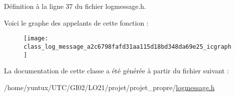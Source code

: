 \-Définition à la ligne 37 du fichier logmessage.\-h.



\-Voici le graphe des appelants de cette fonction \-:\nopagebreak
\begin{figure}[H]
\begin{center}
\leavevmode
\texttt{[image: class\_log\_message\_a2c6798fafd31aa115d18bd348da69e25\_icgraph]}
\end{center}
\end{figure}




\-La documentation de cette classe a été générée à partir du fichier suivant \-:\begin{DoxyCompactItemize}
\item 
/home/yuntux/\-U\-T\-C/\-G\-I02/\-L\-O21/projet/projet\-\_\-propre/\hyperlink{logmessage_8h}{logmessage.\-h}\end{DoxyCompactItemize}
